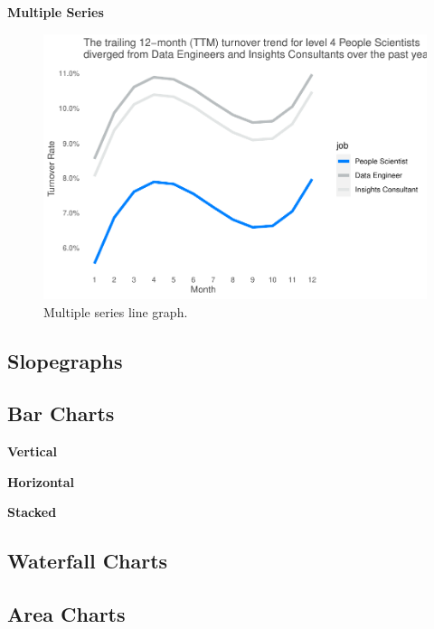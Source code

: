\documentclass[
]{book}
\begin{document}
\textbf{Multiple Series}

\begin{figure}

{\centering \includegraphics[width=1\linewidth]{People_Analytics_Lifecycle_files/figure-latex/multi-line-graph-1} 

}

\caption{Multiple series line graph.}\label{fig:multi-line-graph}
\end{figure}

\hypertarget{slopegraphs}{%
\subsection{Slopegraphs}\label{slopegraphs}}

\hypertarget{bar-charts}{%
\subsection{Bar Charts}\label{bar-charts}}

\textbf{Vertical}

\textbf{Horizontal}

\textbf{Stacked}

\hypertarget{waterfall-charts}{%
\subsection{Waterfall Charts}\label{waterfall-charts}}

\hypertarget{area-charts}{%
\subsection{Area Charts}\label{area-charts}}
\end{document}
